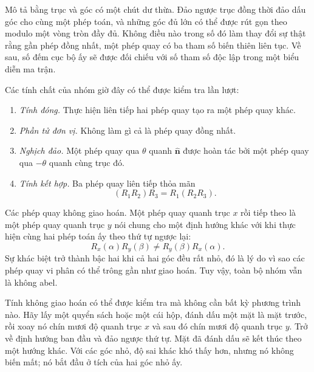 Mô tả bằng trục và góc có một chút dư thừa. Đảo ngược trục đồng thời đảo dấu góc cho cùng một phép toán, và những góc đủ lớn có thể được rút gọn theo modulo một vòng tròn đầy đủ. Không điều nào trong số đó làm thay đổi sự thật rằng gần phép đồng nhất, một phép quay có ba tham số biến thiên liên tục. Về sau, số đếm cục bộ ấy sẽ được đối chiếu với số tham số độc lập trong một biểu diễn ma trận.

Các tính chất của nhóm giờ đây có thể được kiểm tra lần lượt:
\begin{enumerate}
\item \emph{Tính đóng.} Thực hiện liên tiếp hai phép quay tạo ra một phép quay khác.
\item \emph{Phần tử đơn vị.} Không làm gì cả là phép quay đồng nhất.
\item \emph{Nghịch đảo.} Một phép quay qua \(\theta\) quanh \(\hat{\boldsymbol n}\) được hoàn tác bởi một phép quay qua \(-\theta\) quanh cùng trục đó.
\item \emph{Tính kết hợp.} Ba phép quay liên tiếp thỏa mãn
\[
(R_1R_2)R_3=R_1(R_2R_3).
\]
\end{enumerate}

Các phép quay không giao hoán. Một phép quay quanh trục \(x\) rồi tiếp theo là một phép quay quanh trục \(y\) nói chung cho một định hướng khác với khi thực hiện cùng hai phép toán ấy theo thứ tự ngược lại:
\begin{equation}
R_x(\alpha)R_y(\beta)\ne R_y(\beta)R_x(\alpha).
\end{equation}
Sự khác biệt trở thành bậc hai khi cả hai góc đều rất nhỏ, đó là lý do vì sao các phép quay vi phân có thể trông gần như giao hoán. Tuy vậy, toàn bộ nhóm vẫn là không abel.

Tính không giao hoán có thể được kiểm tra mà không cần bất kỳ phương trình nào. Hãy lấy một quyển sách hoặc một cái hộp, đánh dấu một mặt là mặt trước, rồi xoay nó chín mươi độ quanh trục \(x\) và sau đó chín mươi độ quanh trục \(y\). Trở về định hướng ban đầu và đảo ngược thứ tự. Mặt đã đánh dấu sẽ kết thúc theo một hướng khác. Với các góc nhỏ, độ sai khác khó thấy hơn, nhưng nó không biến mất; nó bắt đầu ở tích của hai góc nhỏ ấy.

\begin{classroomqa}
\end{classroomqa}

